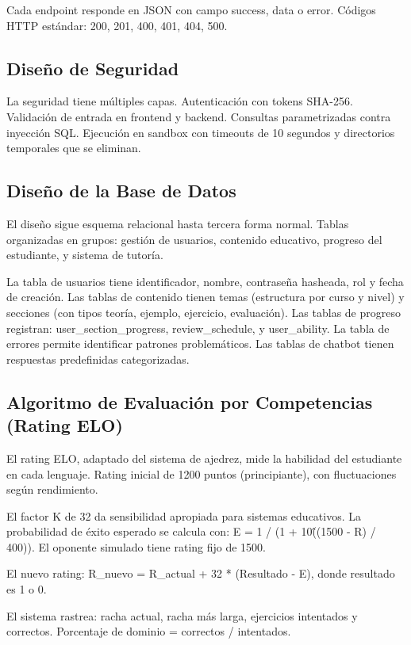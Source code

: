 \documentclass[12pt,letterpaper]{article}
\begin{document}
Cada endpoint responde en JSON con campo success, data o error. Códigos HTTP estándar: 200, 201, 400, 401, 404, 500.

\subsection{Diseño de Seguridad}

La seguridad tiene múltiples capas. Autenticación con tokens SHA-256. Validación de entrada en frontend y backend. Consultas parametrizadas contra inyección SQL. Ejecución en sandbox con timeouts de 10 segundos y directorios temporales que se eliminan.

\subsection{Diseño de la Base de Datos}

El diseño sigue esquema relacional hasta tercera forma normal. Tablas organizadas en grupos: gestión de usuarios, contenido educativo, progreso del estudiante, y sistema de tutoría.

La tabla de usuarios tiene identificador, nombre, contraseña hasheada, rol y fecha de creación. Las tablas de contenido tienen temas (estructura por curso y nivel) y secciones (con tipos teoría, ejemplo, ejercicio, evaluación). Las tablas de progreso registran: user\_section\_progress, review\_schedule, y user\_ability. La tabla de errores permite identificar patrones problemáticos. Las tablas de chatbot tienen respuestas predefinidas categorizadas.

\subsection{Algoritmo de Evaluación por Competencias (Rating ELO)}

El rating ELO, adaptado del sistema de ajedrez, mide la habilidad del estudiante en cada lenguaje. Rating inicial de 1200 puntos (principiante), con fluctuaciones según rendimiento.

El factor K de 32 da sensibilidad apropiada para sistemas educativos. La probabilidad de éxito esperado se calcula con: E = 1 / (1 + 10\^{((1500 - R) / 400)}). El oponente simulado tiene rating fijo de 1500.

El nuevo rating: R\_nuevo = R\_actual + 32 * (Resultado - E), donde resultado es 1 o 0.

El sistema rastrea: racha actual, racha más larga, ejercicios intentados y correctos. Porcentaje de dominio = correctos / intentados.
\end{document}
